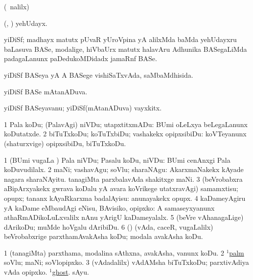 \bentry
{}
\gl{\saMkiSx} 
\bmng
(\UK\ nalilx) 
\emng
\eentry

\bentry
{} 
\gl{\nA} 
\bmng
(\ashi, \hiV) yehUdayx.
\emng
\eentry

\bentry
{} 
\gl{\nA} 
\bmng
yiDiSf; madhayx matutx  pUvaR yUroVpina yA alilxMda baMda yehUdayxru baLasuva BASe, modalige,  hiVbaUrx matutx halavAru Adhunika BASegaLiMda padagaLanunx paDedukoMDidadx jamaRnf BASe.
\emng 
\eentry

\bentry
{} 
\gl{\gu} 
\bmng
yiDiSf BASeya yA A BASege vishiSaTxvAda, saMbaMdhisida.
\emng 
\eentry

\bentry
{} 
\gl{\gu} 
\bmng
yiDiSf BASe mAtanADuva.
\emng
\eentry

\bentry
{} 
\gl{\nA} 
\bmng
yiDiSf BASeyavanu; yiDiSf(mAtanADuva) vayxkitx.
\emng
\eentry

\bentry
{} 
\gl{\sakirx} 
\bmng
\bnum
\num{1} Pala koDu; (PalavAgi) niVDu; utapxtitxmADu:  BUmi oLeLxya beLegaLanunx koDutatxde. 
\num{2} biTuTxkoDu; koTuTxbiDu; vashakekx opipxsibiDu:  koVTeyanunx (shaturxvige) opipxsibiDu, biTuTxkoDu.
\enum
\emng  

\noindent                   
\gl{\akirx} 
\bmng
\bnum
\num{1} (BUmi \mo vugaLa \vi) Pala niVDu; Pasalu koDu, niVDu:  BUmi cenAnxgi Pala koDuvudilalx. 
\num{2} maNi; vashavAgu; soVlu; sharaNAgu:  AkarxmaNakekx kAyade nagara sharaNAyitu.  tanagiMta parxbalavAda shakitxge maNi. 
\num{3} (beVrobabxra aBipArxyakekx gwrava koDalu yA avara koVrikege utatxravAgi) samamxtisu; opupx; tananx kAyaRkarxma badalAyisu:  anunayakekx opupx. 
\num{4} kaDameyAgiru yA kaDame eMbaudAgi eNisu, BAvisiko, opipxko:  A samaseyxyanunx athaRmADikoLuLxvalilx nAnu yArigU kaDameyalalx. 
\num{5} (beVre vAhanagaLige) dArikoDu; muMde hoVgalu dAribiDu. 
\num{6} (\ame) (vAda, caceR, \mo vugaLalilx) beVrobabxrige parxthamAvakAsha koDu; modala avakAsha koDu.
\enum
\emng

\noindent
\gl{\pagu} 
\bmng
\bnum
\num{1}  (tanagiMta) parxthama, modalina sAthxna, avakAsha, \mo vanunx koDu. 
\num{2}  \hyperref{kandict_p.pdf}{P}{palm(1) pagu(3)}{$^1$palm} soVlu; maNi; soVlopipxko. 
\num{3}   (vAdadalilx) vAdAMsha biTuTxkoDu; parxtivAdiya vAda opipxko. 
  \hyperref{kandict_g.pdf}{G}{ghost(1) nuga(5)}{$^1$ghost}. 
\banum
{} sAyu.

